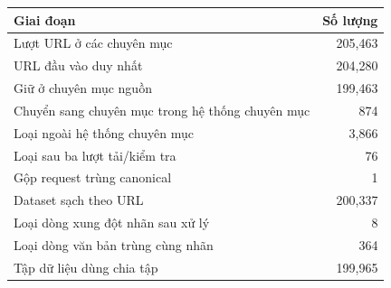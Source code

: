 \begin{tabularx}{\linewidth}{>{\raggedright\arraybackslash}Xr}
\toprule
Giai đoạn & Số lượng\\\midrule
Lượt URL ở các chuyên mục & 205,463\\
URL đầu vào duy nhất & 204,280\\
Giữ ở chuyên mục nguồn & 199,463\\
Chuyển sang chuyên mục trong hệ thống chuyên mục & 874\\
Loại ngoài hệ thống chuyên mục & 3,866\\
Loại sau ba lượt tải/kiểm tra & 76\\
Gộp request trùng canonical & 1\\
Dataset sạch theo URL & 200,337\\
Loại dòng xung đột nhãn sau xử lý & 8\\
Loại dòng văn bản trùng cùng nhãn & 364\\
Tập dữ liệu dùng chia tập & 199,965\\
\bottomrule\end{tabularx}
